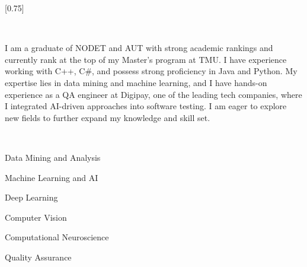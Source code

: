 \documentclass[lighthipster]{simplehipstercv}
\begin{document}
\setlength{\columnsep}{1.5cm}
[0.75]
\begin{paracol}{2}

\paracolbackgroundoptions



\footnotesize
{\setasidefontcolour
\centering
\begin{center}
\end{center}

\\[0.5em]

{\footnotesize
	\justifying
	\begin{spacing}{1.5}
	I am a graduate of NODET and AUT with strong academic rankings and currently rank at the top of my Master’s program at TMU. I have experience working with C++, C\#, and possess strong proficiency in Java and Python. My expertise lies in data mining and machine learning, and I have hands-on experience as a QA engineer at Digipay, one of the leading tech companies, where I integrated AI-driven approaches into software testing. I am eager to explore new fields to further expand my knowledge and skill set.
	\end{spacing}
		
	

}
\bigskip

%
%



 \\[0.5em]

\begin{spacing}{1.5}
Data Mining and Analysis

Machine Learning and AI

Deep Learning

Computer Vision

Computational Neuroscience

Quality Assurance
\end{spacing}



}
\end{paracol}
\end{document}
